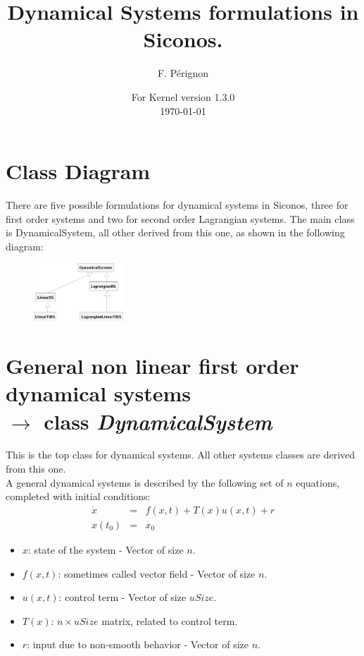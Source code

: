 \documentclass[10pt]{article}
\begin{document}
\thispagestyle{empty}
\title{Dynamical Systems formulations in Siconos.}
\author{F. P\'erignon}

\date{For Kernel version 1.3.0 \\
 \today}
\maketitle

\pagestyle{fancy}

\section{Class Diagram}
There are five possible formulations for dynamical systems in Siconos,
three for first order systems and two for second order Lagrangian systems. The main class is DynamicalSystem, all other derived from this one, as shown in the following diagram:
\begin{figure}[htbp]
  \centering
 \includegraphics[width=0.3\textwidth]{./DSClassDiagram.eps}
  \label{DSDiagram}
\end{figure}
\section{General non linear first order dynamical systems \\ $\rightarrow$ class \it{DynamicalSystem}}
This is the top class for dynamical systems. All other systems classes are derived from this one. \\

A general dynamical systems is described by the following set of $n$ equations, completed with initial conditions:
\begin{eqnarray} \label{firstOrderSystem}
  \dot x &=& f(x,t) + T(x) u(x, t) + r \\
  x(t_0)&=&x_0 
\end{eqnarray}

\begin{itemize}
\item $x$: state of the system - Vector of size $n$.
\item $f(x,t)$: sometimes called vector field - Vector of size $n$.
\item $u(x, t)$: control term - Vector of size $uSize$.
\item $T(x)$: $n\times uSize$ matrix, related to control term.
\item $r$: input due to non-smooth behavior - Vector of size $n$.
\end{itemize}
\end{document}
